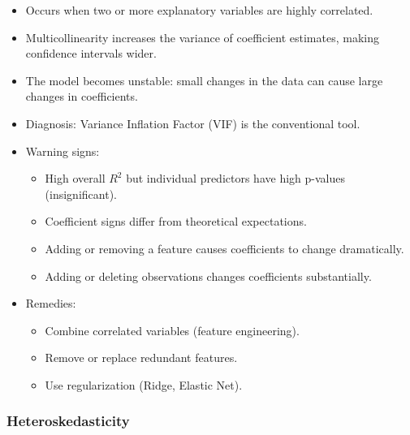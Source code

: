 \documentclass[11pt,a4paper]{article}
\begin{document}
\begin{itemize}
    \item Occurs when two or more explanatory variables are highly correlated.
    \item Multicollinearity increases the variance of coefficient estimates, making confidence intervals wider.
    \item The model becomes unstable: small changes in the data can cause large changes in coefficients.
    \item Diagnosis: Variance Inflation Factor (VIF) is the conventional tool.
    \item Warning signs:
    \begin{itemize}
        \item High overall $R^2$ but individual predictors have high p-values (insignificant).
        \item Coefficient signs differ from theoretical expectations.
        \item Adding or removing a feature causes coefficients to change dramatically.
        \item Adding or deleting observations changes coefficients substantially.
    \end{itemize}
    \item Remedies:
    \begin{itemize}
        \item Combine correlated variables (feature engineering).
        \item Remove or replace redundant features.
        \item Use regularization (Ridge, Elastic Net).
    \end{itemize}
\end{itemize}

\subsubsection{Heteroskedasticity}
\end{document}
